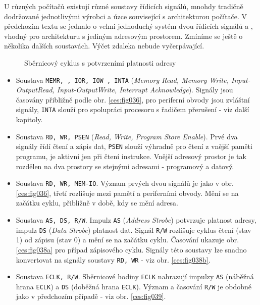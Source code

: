       U různých počítačů existují různé soustavy řídicích signálů, mnohdy tradičně dodržované 
      jednotlivými výrobci a úzce související s architekturou počítače. V předchozím textu se 
      jednalo o velmi jednoduchý systém dvou řídicích signálů  a 
      , vhodný pro architekturu s jediným adresovým prostorem. Zmíníme se 
      ještě o několika dalších soustavách. Výčet zdaleka nebude vyčerpávající.
      
      \begin{figure}[ht!]
        \centering  
            \hspace{1em}
        \caption{Sběrnicový cyklus s potvrzeními platnosti adresy}
        \label{ces:fig038}
      \end{figure}
      
      \begin{itemize}[noitemsep]
        \item Soustava \texttt{MEMR, , IOR, IOW , INTA} (\emph{Memory Read,  
              Memory Write, Input-OutputRead, Input-Output\-Write, Interrupt Acknowledge}). Signály 
              jsou časovány přibližně podle obr. \ref{ces:fig036}, pro periferní obvody 
              jsou zvláš\-tní signály, \texttt{INTA} slouží pro spolupráci procesoru s řadičem 
              přerušení - viz další kapitoly.
        \item Soustava \texttt{RD, WR, PSEN} (\emph{Read, Write, Program Store Enable}). Prvé 
              dva signály řídí čtení a zápis dat, \texttt{PSEN} slouží výhradně pro čtení z vnější 
              paměti programu, je aktivní jen při čtení instrukce. Vnější adresový prostor je tak 
              rozdělen na dva prostory se stejnými adresami - programový a datový.
        \item Soustava \texttt{RD,  WR, MEM-IO}. Význam prvých dvou signálů je jako v obr. 
              \ref{ces:fig036}, třetí rozlišuje mezi pamětí a periferními obvody. Mění se 
              na začátku cyklu, přibližně v době, kdy se mění adresa.
        \item Soustava \texttt{AS, DS, R/W}. Impulz \texttt{AS} (\emph{Address Strobe}) potvrzuje  
              platnost adresy, impulz \texttt{DS}  (\emph{Data Strobe}) platnost dat. Signál 
              \texttt{R/W} rozlišuje cyklus čtení (stav 1) od zápisu (stav 0) a mění se na začátku 
              cyklu. Časování ukazuje obr. \ref{ces:fig038a} pro případ zápisového cyklu. 
              Signály této soustavy lze snadno konvertovat na signály soustavy \texttt{RD, WR} - 
              viz obr. \ref{ces:fig038b}.
        \item Soustava \texttt{ECLK, R/W}. Sběrnicové hodiny \texttt{ECLK} nahrazují impulzy 
              \texttt{AS} (náběžná hrana \texttt{ECLK}) a \texttt{DS} (doběžná hrana 
              \texttt{ECLK}). Význam a časování \texttt{R/W} je obdobné jako v předchozím případě - 
              viz obr. \ref{ces:fig039}.
      \end{itemize}

